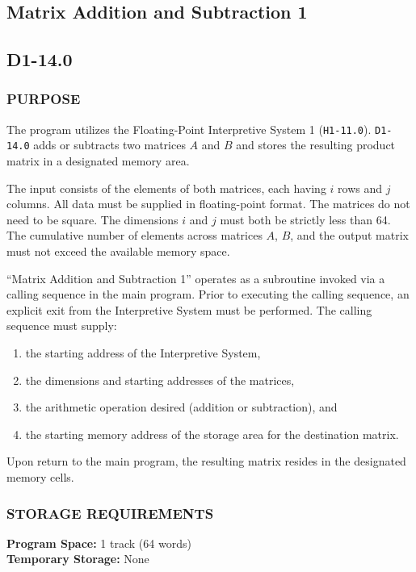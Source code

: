 \documentclass{article}
\begin{document}
\subsection{Matrix Addition and Subtraction 1}
\label{subsec:matrix_addition_subtraction_1}

\subsection*{D1-14.0}

\subsubsection*{PURPOSE}
The program utilizes the Floating-Point Interpretive System 1 (\texttt{H1-11.0}). \texttt{D1-14.0} adds or subtracts two matrices $A$ and $B$ and stores the resulting product matrix in a designated memory area. 

The input consists of the elements of both matrices, each having $i$ rows and $j$ columns. All data must be supplied in floating-point format. The matrices do not need to be square. The dimensions $i$ and $j$ must both be strictly less than 64. The cumulative number of elements across matrices $A$, $B$, and the output matrix must not exceed the available memory space.

\noindent
``Matrix Addition and Subtraction 1'' operates as a subroutine invoked via a calling sequence in the main program. Prior to executing the calling sequence, an explicit exit from the Interpretive System must be performed. The calling sequence must supply: 
\begin{enumerate}
	\item the starting address of the Interpretive System,
	\item the dimensions and starting addresses of the matrices,
	\item the arithmetic operation desired (addition or subtraction), and
	\item the starting memory address of the storage area for the destination matrix. 
\end{enumerate}
\noindent
Upon return to the main program, the resulting matrix resides in the designated memory cells.

\subsubsection*{STORAGE REQUIREMENTS}
\noindent
\textbf{Program Space:} 1 track (64 words) \\
\textbf{Temporary Storage:} None
\end{document}
